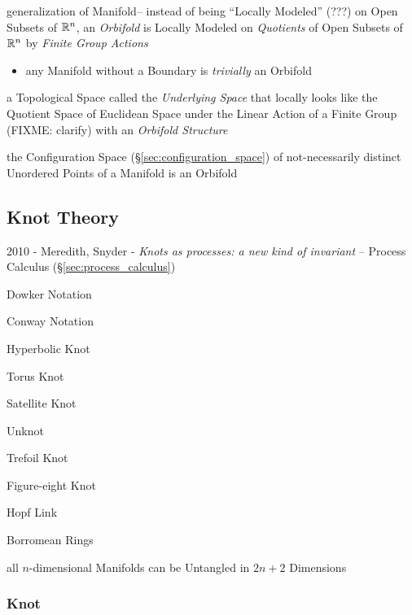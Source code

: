 generalization of Manifold--
instead of being ``Locally Modeled'' (???) on Open Subsets of $\mathbb{R}^n$, an
\emph{Orbifold} is Locally Modeled on \emph{Quotients} of Open Subsets of
$\mathbb{R}^n$ by \emph{Finite Group Actions}

\begin{itemize}
  \item any Manifold without a Boundary is \emph{trivially} an Orbifold
\end{itemize}

a Topological Space called the \emph{Underlying Space} that locally looks like
the Quotient Space of Euclidean Space under the Linear Action of a Finite Group
(FIXME: clarify) with an \emph{Orbifold Structure}

the Configuration Space (\S\ref{sec:configuration_space}) of not-necessarily
distinct Unordered Points of a Manifold is an Orbifold



\subsection{Knot Theory} \label{sec:knot_theory}

2010 - Meredith, Snyder - \emph{Knots as processes: a new kind of invariant} --
\fist Process Calculus (\S\ref{sec:process_calculus})

Dowker Notation

Conway Notation



Hyperbolic Knot

Torus Knot

Satellite Knot



Unknot

Trefoil Knot

Figure-eight Knot

Hopf Link

Borromean Rings

\asterism

all $n$-dimensional Manifolds can be Untangled in $2n + 2$ Dimensions



\subsubsection{Knot} \label{sec:knot}

